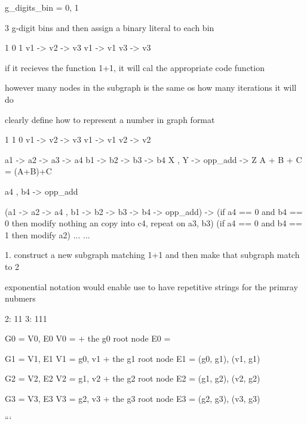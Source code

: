 g_digits_bin = {0, 1}

3 g-digit bins and then assign a binary literal to each bin

1     0     1
v1 -> v2 -> v3
v1 -> v1
v3 -> v3

if it recieves the function 1+1, it will cal the appropriate code function

however many nodes in the subgraph is the same os how many iterations it will do

clearly define how to represent a number in graph format

1     1     0
v1 -> v2 -> v3
v1 -> v1
v2 -> v2



a1 -> a2 -> a3 -> a4
b1 -> b2 -> b3 -> b4
X , Y -> opp_add -> Z
A + B + C = (A+B)+C

a4 , b4 -> opp_add

(a1 -> a2 -> a4 , b1 -> b2 -> b3 -> b4 -> opp_add) -> 
    (if a4 == 0 and b4 == 0 then modify nothing an copy into c4, repeat on a3, b3)
    (if a4 == 0 and b4 == 1 then modify a2)
    ...
    ...




1. construct a new subgraph matching 1+1 and then make that subgraph match to 2

exponential notation would enable use to have repetitive strings for the primray nubmers

2: 11
3: 111

G0 = {V0, E0}
V0 = {} + the g0 root node
E0 = {}

G1 = {V1, E1}
V1 = {g0, v1} + the g1 root node
E1 = {(g0, g1), (v1, g1)}

G2 = {V2, E2}
V2 = {g1, v2} + the g2 root node
E2 = {(g1, g2), (v2, g2)}

G3 = {V3, E3}
V3 = {g2, v3} + the g3 root node
E3 = {(g2, g3), (v3, g3)}








```